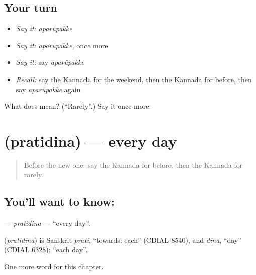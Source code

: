 \subsection*{Your turn}
\begin{itemize}
\raggedright
  \item \emph{Say it:} \emph{aparūpakke}
  \item \emph{Say it:} \emph{aparūpakke}, once more
  \item \emph{Say it:} say \emph{aparūpakke}
  \item \emph{Recall:} say the Kannada for the weekend, then the Kannada for before, then say \emph{aparūpakke} again
\end{itemize}

\begin{tcolorbox}[breakable,colback=teal!4,colframe=teal!35!black,title={Before you move on}]
What does  mean? (\textquotedblleft{}Rarely\textquotedblright{}.) Say it once more.
\end{tcolorbox}
\section[\texorpdfstring{\kn{ಪ್ರತಿದಿನ} (pratidina)}{ಪ್ರತಿದಿನ (pratidina)}]{ (pratidina) — every day}

\label{lesson:KA-C172-pratidina}



\begin{quote}
Before the new one: say the Kannada for before, then the Kannada for rarely.
\end{quote}

\subsection*{You'll want to know: }
\textbf{} — \emph{pratidina} — \textquotedblleft{}every day\textquotedblright{}.

\begin{cousinweb}
\textbf{} (\emph{pratidina}) is Sanskrit \emph{prati}, \textquotedblleft{}towards; each\textquotedblright{} (CDIAL 8540), and \emph{dina}, \textquotedblleft{}day\textquotedblright{} (CDIAL 6328): \textquotedblleft{}each day\textquotedblright{}.
\end{cousinweb}

\begin{grammarlens}[title={What you've built}]
One more word for this chapter.
\end{grammarlens}

